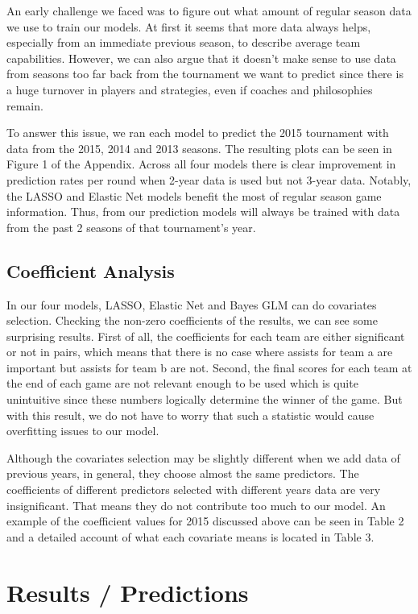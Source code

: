 \documentclass{article} %
\begin{document}
An early challenge we faced was to figure out what amount of regular season data we use to train our models. At first it seems that more data always helps, especially from an immediate previous season, to describe average team capabilities.  However, we can also argue that it doesn't make sense to use data from seasons too far back from the tournament we want to predict since there is a huge turnover in players and strategies, even if coaches and philosophies remain.

To answer this issue, we ran each model to predict the 2015 tournament with data from the 2015, 2014 and 2013 seasons. The resulting plots can be seen in Figure 1 of the Appendix. Across all four models there is clear improvement in prediction rates per round when 2-year data is used but not 3-year data. Notably, the LASSO and Elastic Net models benefit the most of regular season game information. Thus, from our prediction models will always be trained with data from the past 2 seasons of that tournament's year.

\subsection{Coefficient Analysis}

In our four models, LASSO, Elastic Net and Bayes GLM can do covariates selection. Checking the non-zero coefficients of the results, we can see some surprising results. First of all, the coefficients for each team are either significant or not in pairs, which means that there is no case where assists for team a are important but assists for team b are not. Second, the final scores for each team at the end of each game are not relevant enough to be used which is quite unintuitive since these numbers logically determine the winner of the game. But with this result, we do not have to worry that such a statistic would cause overfitting issues to our model.\

Although the covariates selection may be slightly different when we add data of previous years, in general, they choose almost the same predictors. The coefficients of different predictors selected with different years data are very insignificant. That means they do not contribute too much to our model. An example of the coefficient values for 2015 discussed above can be seen in Table 2 and a detailed account of what each covariate means is located in Table 3.

\section{Results / Predictions}
\end{document}
